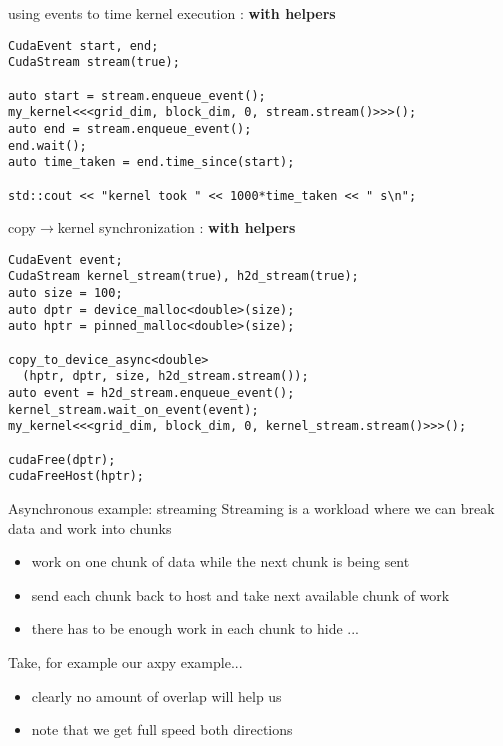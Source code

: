 \begin{frame}[fragile]{}
    \begin{code}{using events to time kernel execution : \textbf{with helpers}}
        \begin{lstlisting}[style=boxcudatiny]
CudaEvent start, end;
CudaStream stream(true);

auto start = stream.enqueue_event();
my_kernel<<<grid_dim, block_dim, 0, stream.stream()>>>();
auto end = stream.enqueue_event();
end.wait();
auto time_taken = end.time_since(start);

std::cout << "kernel took " << 1000*time_taken << " s\n";
        \end{lstlisting}
    \end{code}
    \begin{code}{copy$\rightarrow$kernel synchronization : \textbf{with helpers}}
        \begin{lstlisting}[style=boxcudatiny]
CudaEvent event;
CudaStream kernel_stream(true), h2d_stream(true);
auto size = 100;
auto dptr = device_malloc<double>(size);
auto hptr = pinned_malloc<double>(size);

copy_to_device_async<double>
  (hptr, dptr, size, h2d_stream.stream());
auto event = h2d_stream.enqueue_event();
kernel_stream.wait_on_event(event);
my_kernel<<<grid_dim, block_dim, 0, kernel_stream.stream()>>>();

cudaFree(dptr);
cudaFreeHost(hptr);
        \end{lstlisting}
    \end{code}
\end{frame}

\begin{frame}[fragile]{Asynchronous example: streaming}
    Streaming is a workload where we can break data and work into chunks
    \begin{itemize}
        \item work on one chunk of data while the next chunk is being sent
        \item send each chunk back to host and take next available chunk of work
        \item there has to be enough work in each chunk to hide ...
    \end{itemize}

    Take, for example our axpy example...
    \begin{itemize}
        \item clearly no amount of overlap will help us
        \item note that we get full speed both directions
    \end{itemize}
\end{frame}


